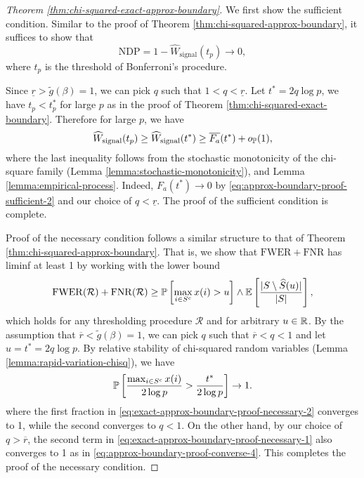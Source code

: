 \begin{proof}[Theorem \ref{thm:chi-squared-exact-approx-boundary}]
We first show the sufficient condition.
Similar to the proof of Theorem \ref{thm:chi-squared-approx-boundary}, it suffices to show that
\begin{equation} \label{eq:exact-approx-boundary-proof-sufficient-1}
    \text{NDP} = 1 - \widehat{W}_\text{signal}(t_p) \to 0,
\end{equation}
where $t_p$ is the threshold of Bonferroni's procedure.

Since $\underline{r}>\widetilde{g}(\beta)=1$, we can pick $q$ such that $1<q<\underline{r}$.
Let $t^* = 2q\log{p}$, we have $t_p<t_p^*$ for large $p$ as in the proof of Theorem \ref{thm:chi-squared-exact-boundary}.
Therefore for large $p$, we have
$$
\widehat{W}_\text{signal}(t_p) \ge \widehat{W}_\text{signal}(t^*) \ge \overline{F_a}(t^*) + o_\P(1),
$$
where the last inequality follows from the stochastic monotonicity of the chi-square family (Lemma \ref{lemma:stochastic-monotonicity}), and Lemma \ref{lemma:empirical-process}.
Indeed, $F_a(t^*)\to0$ by \eqref{eq:approx-boundary-proof-sufficient-2} and our choice of $q<\underline{r}$. 
The proof of the sufficient condition is complete.

Proof of the necessary condition follows a similar structure to that of Theorem \ref{thm:chi-squared-approx-boundary}.
That is, we show that $\mathrm{FWER} + \mathrm{FNR}$ has liminf at least 1 by working with the lower bound
\begin{equation} \label{eq:exact-approx-boundary-proof-necessary-1}
    \mathrm{FWER}(\mathcal{R}) + \mathrm{FNR}(\mathcal{R}) \ge \P\left[\max_{i\in S^c}x(i)>u\right] \wedge \E\left[\frac{|S\setminus \widehat{S}(u)|}{|S|}\right],
\end{equation}
which holds for any thresholding procedure $\mathcal{R}$ and for arbitrary $u\in\R$.
By the assumption that $\overline{r}<\widetilde{g}(\beta)=1$, we can pick $q$ such that $\overline{r}<q<1$ and let $u = t^*=2q\log{p}$.
By relative stability of chi-squared random variables (Lemma \ref{lemma:rapid-variation-chisq}), we have
\begin{equation} \label{eq:exact-approx-boundary-proof-necessary-2}
    \P\left[\frac{\max_{i\in S^c} x(i)}{2\log{p}} > \frac{t^*}{2\log{p}}\right] \to 1.
\end{equation}
where the first fraction in \eqref{eq:exact-approx-boundary-proof-necessary-2} converges to 1, while the second converges to $q<1$.
On the other hand, by our choice of $q>\overline{r}$, the second term in \eqref{eq:exact-approx-boundary-proof-necessary-1} also converges to 1 as in \eqref{eq:approx-boundary-proof-converse-4}.
This completes the proof of the necessary condition.
\end{proof}


